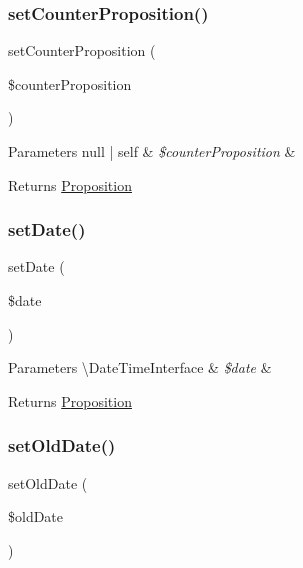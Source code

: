 \subsubsection{\texorpdfstring{setCounterProposition()}{setCounterProposition()}}
{\footnotesize\ttfamily set\+Counter\+Proposition (\begin{DoxyParamCaption}\item[{?self}]{\$counter\+Proposition }\end{DoxyParamCaption})}


\begin{DoxyParams}[1]{Parameters}
null | self & {\em \$counter\+Proposition} & \\
\hline
\end{DoxyParams}
\begin{DoxyReturn}{Returns}
\mbox{\hyperlink{class_app_1_1_entity_1_1_proposition}{Proposition}} 
\end{DoxyReturn}
\mbox{\label{class_app_1_1_entity_1_1_proposition_a7bd268eb6b87dd3cd469dee46bba778a}} 
\subsubsection{\texorpdfstring{setDate()}{setDate()}}
{\footnotesize\ttfamily set\+Date (\begin{DoxyParamCaption}\item[{\textbackslash{}Date\+Time\+Interface}]{\$date }\end{DoxyParamCaption})}


\begin{DoxyParams}[1]{Parameters}
\textbackslash{}\+Date\+Time\+Interface & {\em \$date} & \\
\hline
\end{DoxyParams}
\begin{DoxyReturn}{Returns}
\mbox{\hyperlink{class_app_1_1_entity_1_1_proposition}{Proposition}} 
\end{DoxyReturn}
\mbox{\label{class_app_1_1_entity_1_1_proposition_ac9048be57b5a9e5419ff789ebc2d9137}} 
\subsubsection{\texorpdfstring{setOldDate()}{setOldDate()}}
{\footnotesize\ttfamily set\+Old\+Date (\begin{DoxyParamCaption}\item[{?\textbackslash{}Date\+Time\+Interface}]{\$old\+Date }\end{DoxyParamCaption})}


